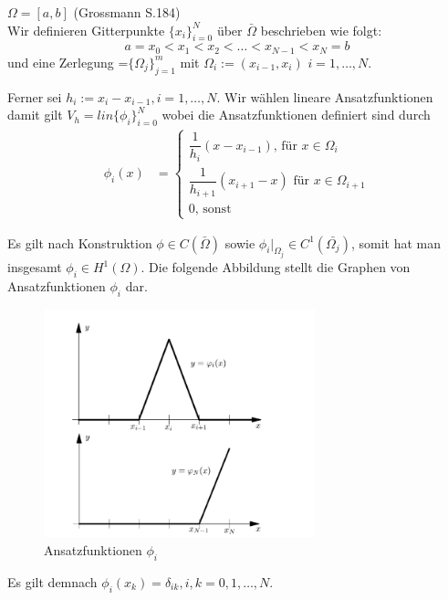 \begin{Beispiel} $\Omega = [a,b]$ (Grossmann S.184) \\
Wir definieren Gitterpunkte $\{x_i\}_{i=0}^{N}$ über $\bar\Omega$  beschrieben wie folgt:
\begin{equation*}
a = x_0 < x_1 < x_2 < \dots < x_{N-1} < x_N = b
\end{equation*}
und eine Zerlegung  {}=$\{ \Omega_j \}_{j=1}^{m}$ mit $\Omega_i := (x_{i-1},x_i)$ $i=1,\dots,N$. 
\end{Beispiel}
Ferner sei $h_i := x_i - x_{i-1}, i=1,\dots,N$. Wir wählen lineare Ansatzfunktionen damit gilt $V_h=lin\{\phi_i\}_{i=0}^{N}$ wobei die Ansatzfunktionen definiert sind durch
\begin{equation}
\begin{aligned}
\phi_i(x) &= 
\begin{cases}
\dfrac{1}{h_i}(x-x_{i-1}) \text{, für } x \in \Omega_i \\
\dfrac{1}{h_{i+1}}(x_{i+1}-x) \text{ für } x \in \Omega_{i+1}  \\
0 \text{, sonst }
\end{cases}
\end{aligned}
\end{equation}

Es gilt nach Konstruktion $\phi \in C(\bar{\Omega})$ sowie $\phi_{i} \Big|_{\Omega_{j}} \in C^{1}(\bar{\Omega_{j}})$, somit hat man insgesamt $\phi_i \in H^{1}(\Omega)$.
Die folgende Abbildung stellt die Graphen von Ansatzfunktionen $\phi_i$ dar.

\begin{figure}[ht]
	\centering
  \includegraphics[width=0.7\textwidth]{hatfunction.png}
	\caption{Ansatzfunktionen $\phi_i$}
	\label{fig:hat}
\end{figure}

Es gilt demnach $\phi_i (x_k) = \delta_{ik}, i,k =0,1,\dots,N$.
